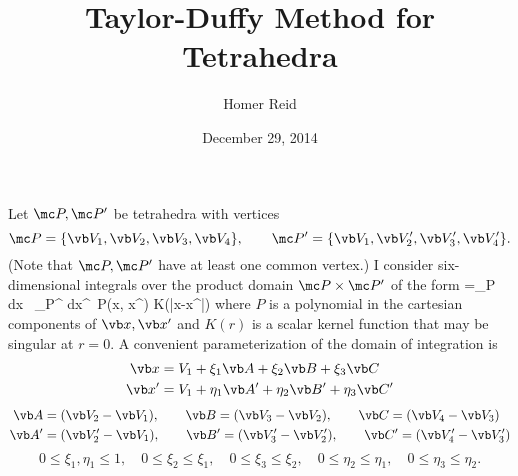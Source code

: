 \documentclass[letterpaper]{article}
\title{Taylor-Duffy Method for Tetrahedra}
\author {Homer Reid}
\date {December 29, 2014}
\begin{document}
\pagestyle{myheadings}
\maketitle

\tableofcontents

Let $\mc P, \mc P^\prime$ be tetrahedra with vertices
$$ \mc P=\{\vb V_1, \vb V_2, \vb V_3, \vb V_4\}, \qquad 
   \mc P^\prime=\{\vb V_1, \vb V_2^\prime, \vb V_3^\prime, \vb V_4^\prime\}.
$$
(Note that $\mc P, \mc P^\prime$ have at least one common vertex.)
I consider six-dimensional integrals over the product 
domain $\mc P\times \mc P^\prime$ of the form
{
=\int_{\mc P} d\vb x \, \int_{\mc P^\prime} d\vb x^\prime \, 
  P(\vb x, \vb x^\prime) K(|\vb x-\vb x^\prime|)
}
where $P$ is a polynomial in the cartesian components of 
$\vb x, \vb x^\prime$ and $K(r)$ is a scalar kernel function that
may be singular at $r=0$. A convenient parameterization of the 
domain of integration is 
\begin{align*}
 \vb x &= V_1 + \xi_1 \vb A
              + \xi_2 \vb B
              + \xi_3 \vb C
\\
 \vb x^\prime &= V_1 + \eta_1 \vb A^\prime
                     + \eta_2 \vb B^\prime
                     + \eta_3 \vb C^\prime
\end{align*}
\begin{align*}
 \vb A&=(\vb V_2-\vb V_1), \qquad 
 \vb B=(\vb V_3-\vb V_2),  \qquad
 \vb C=(\vb V_4-\vb V_3)
\\
 \vb A^\prime&=(\vb V_2^\prime-\vb V_1),       \qquad 
 \vb B^\prime=(\vb V_3^\prime-\vb V_2^\prime), \qquad
 \vb C^\prime=(\vb V_4^\prime-\vb V_3^\prime)
\end{align*}
$$
       0 \le \xi_1, \eta_1 \le 1,
\quad 0 \le \xi_2 \le \xi_1, 
\quad 0 \le \xi_3 \le \xi_2, 
\quad 0 \le \eta_2 \le \eta_1, 
\quad 0 \le \eta_3 \le \eta_2.
$$
\end{document}
